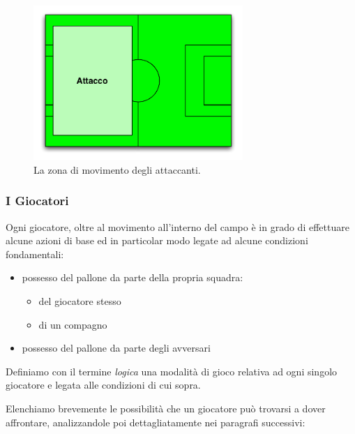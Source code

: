 \documentclass[aps,letterpaper,10pt]{article}
\begin{document}
\begin{figure}[H]
	\begin{center}
		\includegraphics[width=300px]{images/attack.pdf}
	\end{center}
\caption{La zona di movimento degli attaccanti.}
\end{figure}

\subsubsection{I Giocatori}

Ogni giocatore, oltre al movimento all'interno del campo \`e in grado di effettuare alcune azioni di base ed in
particolar modo legate ad alcune condizioni fondamentali:

\begin{itemize}
	\item possesso del pallone da parte della propria squadra:
		\begin{itemize}
			\item del giocatore stesso
			\item di un compagno
		\end{itemize}
	\item possesso del pallone da parte degli avversari
\end{itemize}
	
Definiamo con il termine \textit{logica} una modalit\`a di gioco relativa ad ogni singolo giocatore e legata alle
condizioni di cui sopra. \vspace{3mm}

Elenchiamo brevemente le possibilit\`a che un giocatore pu\`o trovarsi a dover affrontare, analizzandole poi
dettagliatamente nei paragrafi successivi:
\end{document}
